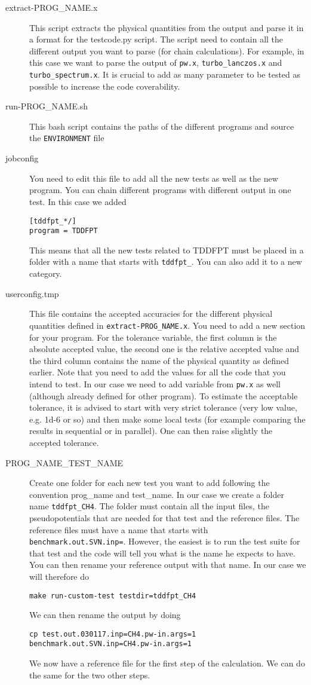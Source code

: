 \documentclass[12pt,a4paper]{article}
\begin{document}
\begin{description}
\item [extract-PROG\_NAME.x] This script extracts the physical quantities from the output and parse it in a format for the testcode.py script. The script need to contain all the different output you want to parse (for chain calculations). For example, in this case we want to parse the output of \texttt{pw.x}, \texttt{turbo\_lanczos.x} and    \texttt{turbo\_spectrum.x}. It is crucial to add as many parameter to be tested as possible to increase the code coverability. 
\item [run-PROG\_NAME.sh] This bash script contains the paths of the different programs and source the \texttt{ENVIRONMENT} file 
\item [jobconfig] You need to edit this file to add all the new tests as well as the new program. You can chain different programs with different output in one test. In this case we added
\begin{verbatim}
[tddfpt_*/]
program = TDDFPT
\end{verbatim}
This means that all the new tests related to TDDFPT must be placed in a folder with a name that starts with \texttt{tddfpt\_}. You can also add it to a new category. 
\item[userconfig.tmp] This file contains the accepted accuracies for the different physical quantities defined in \texttt{extract-PROG\_NAME.x}. You need to add a new section for your program. For the tolerance variable, the first column is the absolute accepted value, the second one is the relative accepted value and the third column contains the name of the physical quantity as defined earlier. Note that you need to add the values for all the code that you intend to test. In our case we need to add variable from \texttt{pw.x} as well (although already defined for other program). 
To estimate the acceptable tolerance, it is advised to start with very strict tolerance (very low value, e.g. 1d-6 or so) and then make some local tests (for example comparing the results in sequential or in parallel). One can then raise slightly the accepted tolerance. 
\item[PROG\_NAME\_TEST\_NAME] Create one folder for each new test you want to add following the convention prog\_name and test\_name. In our case we create a folder name \texttt{tddfpt\_CH4}. The folder must contain all the input files, the pseudopotentials that are needed for that test and the reference files. The reference files must have a name that starts with \texttt{benchmark.out.SVN.inp=}. However, the easiest is to run the test suite for that test and the code will tell you what is the name he expects to have. You can then rename your reference output with that name. In our case we will therefore do
\begin{verbatim}
make run-custom-test testdir=tddfpt_CH4
\end{verbatim}
We can then rename the output by doing 
\begin{verbatim}
cp test.out.030117.inp=CH4.pw-in.args=1 benchmark.out.SVN.inp=CH4.pw-in.args=1
\end{verbatim}
We now have a reference file for the first step of the calculation. We can do the same for the two other steps. 


\end{description}
\end{document}
